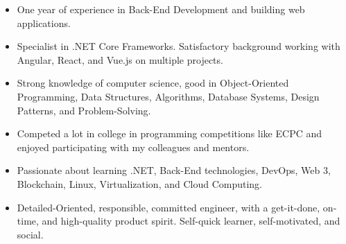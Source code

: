 





\begin{itemize}
    \item One year of experience in Back-End Development and building web applications.
    \item Specialist in .NET Core Frameworks. Satisfactory background working with Angular, React, and Vue.js on multiple projects.
    \item Strong knowledge of computer science, good in Object-Oriented Programming, Data Structures, Algorithms, Database Systems, Design Patterns, and Problem-Solving.
    \item Competed a lot in college in programming competitions like ECPC and enjoyed participating with my colleagues and mentors.
    \item Passionate about learning .NET, Back-End technologies, DevOps, Web 3, Blockchain, Linux, Virtualization, and Cloud Computing.
    \item Detailed-Oriented, responsible, committed engineer, with a get-it-done, on-time, and high-quality product spirit. Self-quick learner, self-motivated, and social.
\end{itemize}